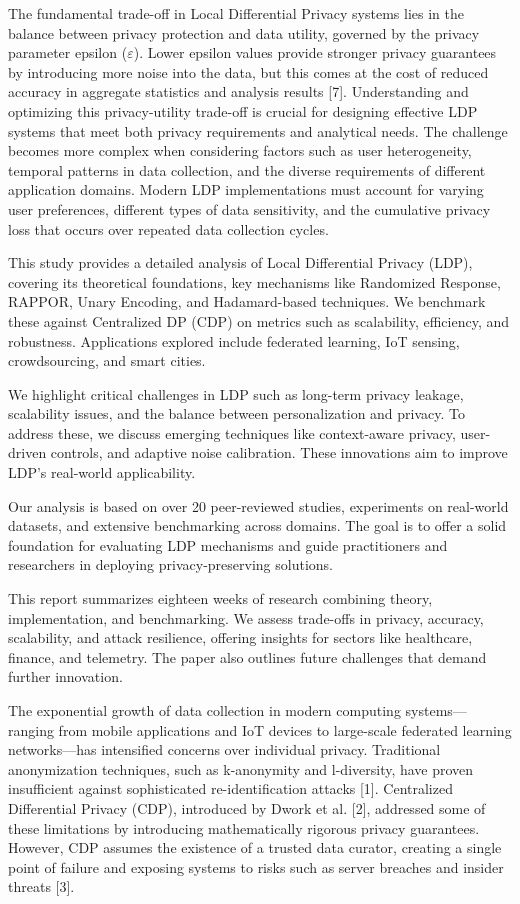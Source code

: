 \documentclass[conference]{IEEEtran}
\begin{document}
The fundamental trade-off in Local Differential Privacy systems lies in the balance between privacy protection and data utility, governed by the privacy parameter epsilon ($\varepsilon$). Lower epsilon values provide stronger privacy guarantees by introducing more noise into the data, but this comes at the cost of reduced accuracy in aggregate statistics and analysis results [7]. Understanding and optimizing this privacy-utility trade-off is crucial for designing effective LDP systems that meet both privacy requirements and analytical needs. The challenge becomes more complex when considering factors such as user heterogeneity, temporal patterns in data collection, and the diverse requirements of different application domains. Modern LDP implementations must account for varying user preferences, different types of data sensitivity, and the cumulative privacy loss that occurs over repeated data collection cycles.

This study provides a detailed analysis of Local Differential Privacy (LDP), covering its theoretical foundations, key mechanisms like Randomized Response, RAPPOR, Unary Encoding, and Hadamard-based techniques. We benchmark these against Centralized DP (CDP) on metrics such as scalability, efficiency, and robustness. Applications explored include federated learning, IoT sensing, crowdsourcing, and smart cities.

We highlight critical challenges in LDP such as long-term privacy leakage, scalability issues, and the balance between personalization and privacy. To address these, we discuss emerging techniques like context-aware privacy, user-driven controls, and adaptive noise calibration. These innovations aim to improve LDP’s real-world applicability.

Our analysis is based on over 20 peer-reviewed studies, experiments on real-world datasets, and extensive benchmarking across domains. The goal is to offer a solid foundation for evaluating LDP mechanisms and guide practitioners and researchers in deploying privacy-preserving solutions.

This report summarizes eighteen weeks of research combining theory, implementation, and benchmarking. We assess trade-offs in privacy, accuracy, scalability, and attack resilience, offering insights for sectors like healthcare, finance, and telemetry. The paper also outlines future challenges that demand further innovation.

The exponential growth of data collection in modern computing systems---ranging from mobile applications and IoT devices to large-scale federated learning networks---has intensified concerns over individual privacy. Traditional anonymization techniques, such as k-anonymity and l-diversity, have proven insufficient against sophisticated re-identification attacks [1]. Centralized Differential Privacy (CDP), introduced by Dwork et al. [2], addressed some of these limitations by introducing mathematically rigorous privacy guarantees. However, CDP assumes the existence of a trusted data curator, creating a single point of failure and exposing systems to risks such as server breaches and insider threats [3].
\end{document}
